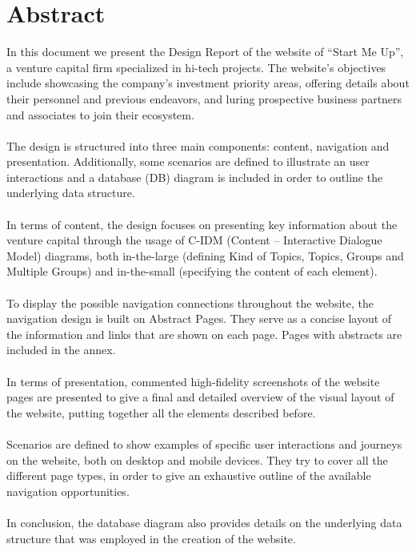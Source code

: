 \documentclass[11pt, letterpaper]{article}
\begin{document}
\cleardoublepage

\fancyhead{}
\fancyfoot{}
\fancyhead[C]{}
\cfoot{\thepage}

\tableofcontents
\cleardoublepage
            
\section{Abstract}
In this document we present the Design Report of the website of “Start Me Up”, a venture capital firm specialized in hi-tech projects. The website's objectives include showcasing the company's investment priority areas, offering details about their personnel and previous endeavors, and luring prospective business partners and associates to join their ecosystem.
\\
\\
The design is structured into three main components: content, navigation and presentation. Additionally, some scenarios are defined to illustrate an user interactions and a database (DB) diagram is included in order to outline the underlying data structure. 
\\
\\
In terms of content, the design focuses on presenting key information about the venture capital through the usage of C-IDM (Content – Interactive Dialogue Model) diagrams, both in-the-large (defining Kind of Topics, Topics, Groups and Multiple Groups) and in-the-small (specifying the content of each element). 
\\
\\
To display the possible navigation connections throughout the website, the navigation design is built on Abstract Pages. They serve as a concise layout of the information and links that are shown on each page. Pages with abstracts are included in the annex. 
\\
\\
In terms of presentation, commented high-fidelity screenshots of the website pages are presented to give a final and detailed overview of the visual layout of the website, putting together all the elements described before. 
\\
\\
Scenarios are defined to show examples of specific user interactions and journeys on the website, both on desktop and mobile devices. They try to cover all the different page types, in order to give an exhaustive outline of the available navigation opportunities. 
\\
\\
In conclusion, the database diagram also provides details on the underlying data structure that was employed in the creation of the website. 
\end{document}
